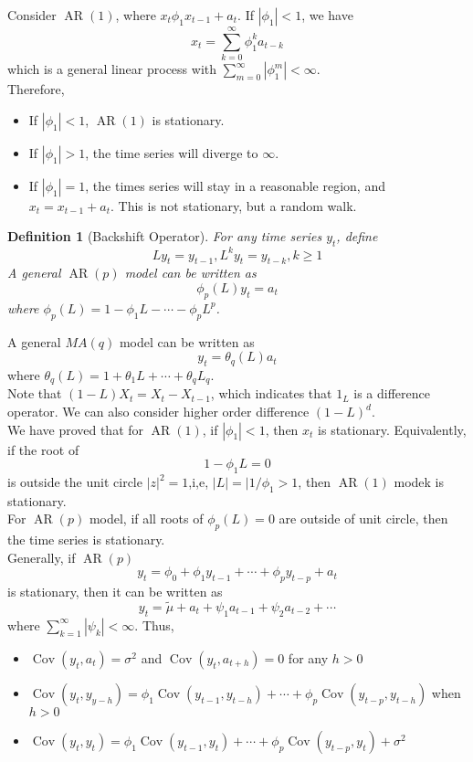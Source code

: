 \documentclass[11pt]{article}
\newtheorem{definition}{Definition}[section]
\theoremstyle{definition}
\DeclareMathOperator{\cov}{Cov}
\DeclareMathOperator{\AR}{AR}
\begin{document}
Consider $\AR(1)$, where $x_t\phi_1x_{t-1} + a_t$. If $|\phi_1| < 1$, we have
\[
x_t = \sum_{k=0}^\infty \phi_1^ka_{t-k}
\]
which is a general linear process with $\sum_{m=0}^\infty |\phi_1^m|<\infty$.\\
Therefore,
\begin{itemize}
  \item If $|\phi_1|<1$, $\AR(1)$ is stationary.
  \item If $|\phi_1|>1$, the time series will diverge to $\infty$.
  \item If $|\phi_1| = 1$, the times series will stay in a reasonable region, and $x_t = x_{t-1} + a_t$. This is not stationary, but a random walk.
\end{itemize}
\begin{definition}[Backshift Operator]
\normalfont For any time series $y_t$, define
\[
Ly_t = y_{t-1}, L^ky_t = y_{t-k}, k\geq 1
\]
A general $\AR(p)$ model can be written as
\[
\phi_p(L)y_t = a_t
\]
where $\phi_p(L)=1-\phi_1L - \cdots - \phi_pL^p$.
\end{definition}
A general $MA(q)$ model can be written as
\[
y_t = \theta_q(L)a_t
\]
where $\theta_q(L) = 1+ \theta_1L + \cdots + \theta_qL_q$.\\
Note that $(1-L)X_t = X_t - X_{t-1}$, which indicates that $1_L$ is a difference operator. We can also consider higher order difference $(1-L)^d$.\\
We have proved that for $\AR(1)$, if $|\phi_1| < 1$, then $x_t$ is stationary. Equivalently, if the root of 
\[
1-\phi_1L=0
\]
is outside the unit circle $|z|^2 = 1$,i,e, $|L|=|1/\phi_1>1$, then $\AR(1)$ modek is stationary.\\
For $\AR(p)$ model, if all roots of $\phi_p(L)=0$ are outside of unit circle, then the time series is stationary.\\
Generally, if $\AR(p)$ 
\[
y_t = \phi_0 + \phi_1y_{t-1} + \cdots +\phi_py_{t-p} + a_t
\]
is stationary, then it can be written as
\[
y_t = \tilde{\mu} + a_t + \psi_1a_{t-1} + \psi_2a_{t-2} + \cdots
\]
where $\sum_{k=1}^\infty |\psi_k| < \infty$. Thus,
\begin{itemize}
  \item $\cov(y_t, a_t) = \sigma^2$ and $\cov(y_t, a_{t+h}) = 0$ for any $h>0$
  \item $\cov(y_t, y_{y-h})=\phi_1\cov(y_{t-1}, y_{t-h}) + \cdots + \phi_p \cov(y_{t-p}, y_{t-h})$ when $h>0$
  \item $\cov(y_t, y_t) = \phi_1\cov(y_{t-1}, y_t) + \cdots + \phi_p\cov(y_{t-p}, y_t) + \sigma^2$
\end{itemize}
\end{document}
